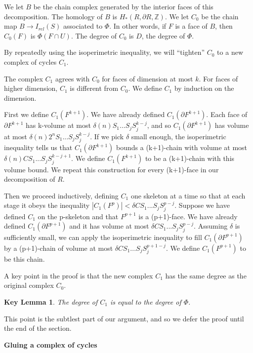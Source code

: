 \documentclass{amsart}
\newtheorem*{Theorem 1}{Theorem 1}
\newtheorem*{Theorem 2}{Theorem 2}
\newtheorem*{Estimate 1}{Estimate 1}
\newtheorem*{Estimate 2}{Estimate 2}
\newtheorem*{key lemma}{Key Lemma}
\numberwithin{equation}{section}
\begin{document}
We let $B$ be the chain complex generated by the interior faces
of this decomposition. The homology of $B$ is $H_*(R, \partial R,
\mathbb{Z})$. We let $C_0$ be the chain map $B \rightarrow
I_{rel}(S)$ associated to $\Phi$.  In other words, if $F$ is a
face of $B$, then $C_0(F)$ is $\Phi(F \cap U)$.  The degree of
$C_0$ is $D$, the degree of $\Phi$.

By repeatedly using the isoperimetric inequality, we will
``tighten'' $C_0$ to a new complex of cycles $C_1$.

The complex $C_1$ agrees with $C_0$ for faces of dimension at
most $k$.  For faces of higher dimension, $C_1$ is different from
$C_0$.  We define $C_1$ by induction on the dimension.

First we define $C_1(F^{k+1})$.  We have already defined
$C_1(\partial F^{k+1})$.  Each face of $\partial F^{k+1}$ has
k-volume at most $\delta(n) S_1 ... S_j S_j^{k-j}$, and so
$C_1(\partial F^{k+1})$ has volume at
most $\delta(n) 2^n S_1 ... S_j S_j^{k-j}$.  If we pick $\delta$
small enough, the isoperimetric inequality tells us that
$C_1(\partial F^{k+1})$ bounds a (k+1)-chain with volume at most
$\delta(n) C S_1 ... S_j S_j^{k-j+1}$.  We define $C_1(F^{k+1})$
to be a (k+1)-chain with this volume bound.  We repeat this
construction for every (k+1)-face in our decomposition of $R$.

Then we proceed inductively, defining $C_1$ one skeleton at a
time so that at each stage it obeys the inequality $|C_1(F^p)| <
\delta C S_1 ... S_j S_j^{p-j}$.  Suppose we have defined $C_1$
on the p-skeleton and that $F^{p+1}$ is a (p+1)-face.  We have
already defined $C_1(\partial F^{p+1})$ and it has volume at most
$\delta C S_1 ... S_j S_j^{p-j}$.  Assuming $\delta$ is
sufficiently small, we can apply the isoperimetric inequality
to fill $C_1(\partial F^{p+1})$ by a (p+1)-chain of
volume at most $\delta C S_1 ... S_j S_j^{p+1-j}$. We define
$C_1(F^{p+1})$ to be this chain.

A key point in the proof is that the new complex $C_1$ has the same degree
as the original complex $C_0$.

\begin{key lemma} The degree of $C_1$ is equal to the degree of $\Phi$.
\end{key lemma}

\noindent This point is the subtlest part of our argument, and so we defer
the proof until the end of the section.

\vskip5pt

{\bf Gluing a complex of cycles}
\end{document}
